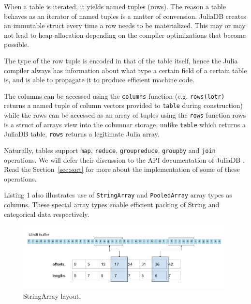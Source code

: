 \documentclass{juliacon}
\begin{document}
When a table is iterated, it yields named tuples (rows). The reason a table behaves as an iterator of named tuples is a matter of convension. JuliaDB creates an immutable struct every time a row needs to be materialized. This may or may not lead to heap-allocation depending on the compiler optimizations that become possible.

The type of the row tuple is encoded in that of the table itself, hence the Julia compiler always has information about what type a certain field of a certain table is, and is able to propagate it to produce efficient machine code.

The columns can be accessed using the \texttt{columns} function (e.g. \texttt{rows(lotr)} returns a named tuple of column vectors provided to \texttt{table} during construction) while the rows can be accessed as an array of tuples using the \texttt{rows} function rows is a struct of arrays view into the columnar storage, unlike \texttt{table} which returns a JuliaDB table, \texttt{rows} returns a legitimate Julia array.

Naturally, tables support \texttt{map}, \texttt{reduce}, \texttt{groupreduce}, \texttt{groupby} and \texttt{join} operations. We will defer their discussion to the API documentation of JuliaDB \cite{juliadbapi}. Read the Section~\ref{sec:sort} for more about the implementation of some of these operations.

Listing 1 also illustrates use of \texttt{StringArray} and \texttt{PooledArray} array types as columns. These special array types enable efficient packing of String and categorical data respectively.


\begin{figure}[t]
\centerline{\includegraphics[width=11cm]{stringarray.png}}
\caption{StringArray layout.}
  \label{fig:stringarray}
\end{figure}
\end{document}
